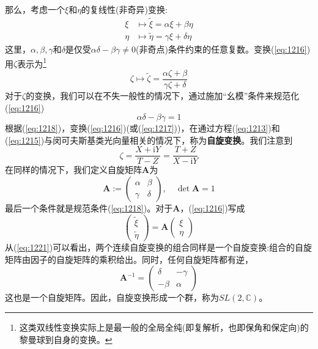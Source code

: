 \documentclass[utf8]{ctexbook}
\numberwithin{equation}{section}
\begin{document}
那么，考虑一个$\xi$和$\eta$的复线性(非奇异)变换:
\begin{equation}
    \begin{split}
        \xi &\mapsto \tilde{\xi}=\alpha\xi +\beta\eta \\
        \eta &\mapsto \tilde{\eta}=\gamma\xi +\delta\eta
    \end{split}\label{eq:1216}
\end{equation}
这里，$\alpha, \beta, \gamma$和$\delta$是仅受$\alpha\delta-\beta\gamma\neq 0$(非奇点)条件约束的任意复数。变换(\ref{eq:1216})用$\zeta$表示为\footnote{这类双线性变换实际上是最一般的全局全纯(即复解析，也即保角和保定向)的黎曼球到自身的变换。}
\begin{equation}
    \zeta \mapsto \tilde{\zeta}=\frac{\alpha\zeta +\beta}{\gamma\zeta +\delta}\label{eq:1217}
\end{equation}
对于$\zeta$的变换，我们可以在不失一般性的情况下，通过施加“幺模”条件来规范化(\ref{eq:1216})
\begin{equation}
    \alpha\delta-\beta\gamma=1\label{eq:1218}
\end{equation}
根据(\ref{eq:1218})，变换(\ref{eq:1216})(或(\ref{eq:1217}))，在通过方程(\ref{eq:1213})和(\ref{eq:1215})与闵可夫斯基类光向量相关的情况下，称为\textbf{自旋变换}。我们注意到
\begin{equation}
    \zeta = \frac{X+\mathrm{i}Y}{T-Z}=\frac{T+Z}{X-\mathrm{i}Y}\label{eq:1219}
\end{equation}
在同样的情况下，我们定义自旋矩阵$\mathbf{A}$为
\begin{equation}
    \mathbf{A}:=\begin{pmatrix}
        \alpha&\beta\\\gamma&\delta
    \end{pmatrix},\quad \det{\mathbf{A}}=1 \label{eq:1220}
\end{equation}
最后一个条件就是规范条件(\ref{eq:1218})。对于$\mathbf{A}$，(\ref{eq:1216})写成
\begin{equation}
    \begin{pmatrix}
        \tilde{\xi}\\\tilde{\eta}
    \end{pmatrix}=\mathbf{A}\begin{pmatrix}
        \xi\\\eta
    \end{pmatrix}\label{eq:1221}
\end{equation}
从(\ref{eq:1221})可以看出，两个连续自旋变换的组合同样是一个自旋变换:组合的自旋矩阵由因子的自旋矩阵的乘积给出。同时，任何自旋矩阵都有逆，
\begin{equation}
    \mathbf{A}^{-1}=\begin{pmatrix}
        \delta&-\gamma\\-\beta&\alpha
    \end{pmatrix}
\end{equation}
这也是一个自旋矩阵。因此，自旋变换形成一个群，称为$SL(2,\mathbb{C})$。
\end{document}

